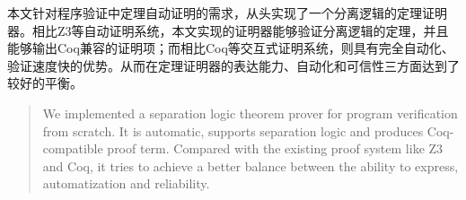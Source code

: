 \begin{cnabstract}
本文针对程序验证中定理自动证明的需求，从头实现了一个分离逻辑的定理证明器。相比Z3等自动证明系统，本文实现的证明器能够验证分离逻辑的定理，并且能够输出Coq兼容的证明项；而相比Coq等交互式证明系统，则具有完全自动化、验证速度快的优势。从而在定理证明器的表达能力、自动化和可信性三方面达到了较好的平衡。

\end{cnabstract}

\begin{abstract}
We implemented a separation logic theorem prover for program verification from scratch. It is automatic, supports separation logic and produces Coq-compatible proof term. Compared with the existing proof system like Z3 and Coq, it tries to achieve a better balance between the ability to express, automatization and reliability.

\end{abstract}
